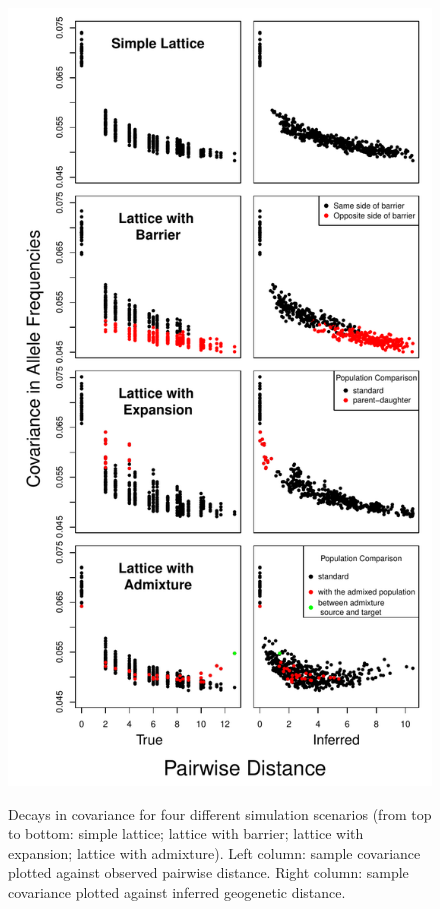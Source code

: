 \documentclass[10pt,letterpaper]{article}
\begin{document}
\setlength{\textwidth}{450pt}
\setlength{\oddsidemargin}{10pt}
\setlength{\evensidemargin}{10pt}
\lhead{}

\begin{figure}
	\centering
		{\includegraphics[height=.8\textheight]{../figs/sims/sim_covariance_decays.pdf}}
		\caption{Decays in covariance for four different simulation scenarios (from top to bottom: simple lattice; lattice with barrier; lattice with expansion; lattice with admixture).  Left column: sample covariance plotted against observed pairwise distance.  Right column: sample covariance plotted against inferred geogenetic distance.}
	\label{sfig:sim_covariance_decays}
\end{figure}
\end{document}
